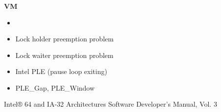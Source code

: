 \documentclass[usenames,dvipsnames, 18pt, compress, aspectratio=169]{beamer}
\begin{document}
\begin{frame}
    \frametitle{}
    \begin{center}
    \textbf{VM}

        \begin{itemize}
            \item <+->
        \end{itemize}

        \begin{itemize}[label={\MVRightarrow}]
            \item Lock holder preemption problem
            \item Lock waiter preemption problem
            \item Intel PLE (pause loop exiting)
            \item PLE\_Gap, PLE\_Window
        \end{itemize}

        \normalsize{Intel® 64 and IA-32 Architectures Software Developer's Manual, Vol. 3}
    \end{center}
\end{frame}
\end{document}

